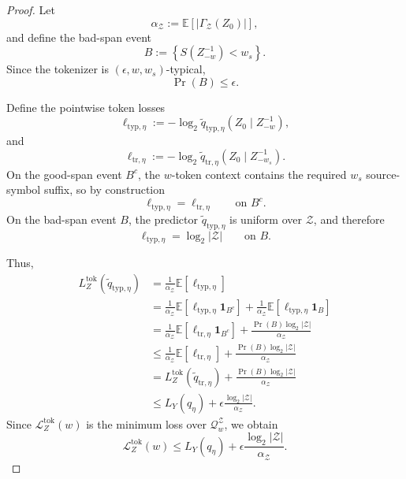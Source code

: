 \documentclass{article}
\theoremstyle{plain}
\theoremstyle{definition}
\theoremstyle{remark}
\begin{document}
\begin{proof}
    Let
    \[
        \alpha_{\mathcal Z}
        :=
        \mathbb E\!\left[
            |\Gamma_{\mathcal Z}(Z_0)|
        \right],
    \]
    and define the bad-span event
    \[
        B
        :=
        \left\{
            S(Z_{-w}^{-1})<w_s
        \right\}.
    \]
    Since the tokenizer is $(\epsilon,w,w_s)$-typical,
    \[
        \Pr(B)\le \epsilon.
    \]
    
    Define the pointwise token losses
    \[
        \ell_{\mathrm{typ},\eta}
        :=
        -\log_2
        \tilde q_{\mathrm{typ},\eta}(Z_0\mid Z_{-w}^{-1}),
    \]
    and
    \[
        \ell_{\mathrm{tr},\eta}
        :=
        -\log_2
        \tilde q_{\mathrm{tr},\eta}(Z_0\mid Z_{-w_s}^{-1}).
    \]
    On the good-span event $B^c$, the $w$-token context contains the required
    $w_s$ source-symbol suffix, so by construction
    \[
        \ell_{\mathrm{typ},\eta}
        =
        \ell_{\mathrm{tr},\eta}
        \qquad
        \text{on } B^c.
    \]
    On the bad-span event $B$, the predictor
    $\tilde q_{\mathrm{typ},\eta}$ is uniform over $\mathcal Z$, and therefore
    \[
        \ell_{\mathrm{typ},\eta}
        =
        \log_2|\mathcal Z|
        \qquad
        \text{on } B.
    \]
    
    Thus,
    \begin{align*}
    L_Z^{\mathrm{tok}}(\tilde q_{\mathrm{typ},\eta})
    &=
    \frac{1}{\alpha_{\mathcal Z}}
    \mathbb E\!\left[
        \ell_{\mathrm{typ},\eta}
    \right] \\
    &=
    \frac{1}{\alpha_{\mathcal Z}}
    \mathbb E\!\left[
        \ell_{\mathrm{typ},\eta}\mathbf 1_{B^c}
    \right]
    +
    \frac{1}{\alpha_{\mathcal Z}}
    \mathbb E\!\left[
        \ell_{\mathrm{typ},\eta}\mathbf 1_B
    \right] \\
    &=
    \frac{1}{\alpha_{\mathcal Z}}
    \mathbb E\!\left[
        \ell_{\mathrm{tr},\eta}\mathbf 1_{B^c}
    \right]
    +
    \frac{\Pr(B)\log_2|\mathcal Z|}{\alpha_{\mathcal Z}} \\
    &\le
    \frac{1}{\alpha_{\mathcal Z}}
    \mathbb E\!\left[
        \ell_{\mathrm{tr},\eta}
    \right]
    +
    \frac{\Pr(B)\log_2|\mathcal Z|}{\alpha_{\mathcal Z}} \\
    &=
    L_Z^{\mathrm{tok}}(\tilde q_{\mathrm{tr},\eta})
    +
    \frac{\Pr(B)\log_2|\mathcal Z|}{\alpha_{\mathcal Z}} \\
    &\le
    L_Y(q_\eta)
    +
    \epsilon\frac{\log_2|\mathcal Z|}{\alpha_{\mathcal Z}}.
    \end{align*}
    Since $\mathcal L_Z^{\mathrm{tok}}(w)$ is the minimum loss over
    $\mathcal Q_w^{\mathcal Z}$, we obtain
    \[
        \mathcal L_Z^{\mathrm{tok}}(w)
        \le
        L_Y(q_\eta)
        +
        \epsilon\frac{\log_2|\mathcal Z|}{\alpha_{\mathcal Z}}.
    \]
    

\end{proof}
\end{document}
